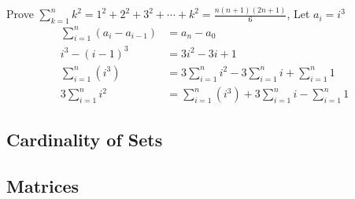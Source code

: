 \documentclass{article}
\begin{document}
Prove $ \sum_{k = 1}^{n} k^2 = 1^2 + 2^2 + 3^2 + \cdots + k^2 = \frac{ n \left( n + 1 \right) \left( 2n + 1 \right) }{ 6 } $, Let $ a_i = i^3 $
\begin{align*}
	\sum_{i = 1}^{n} \left( a_{i} - a_{i - 1} \right) & = a_{n} - a_0                                                                     \\
	i^3 - (i - 1)^{3}                                 & = 3i^2 - 3i + 1                                                                   \\
	\sum_{i = 1}^{n} \left( i^3 \right)               & = 3 \sum_{i = 1}^{n} i^2 - 3 \sum_{i = 1}^{n} i + \sum_{i = 1}^{n} 1              \\
	3 \sum_{i = 1}^{n} i^2                            & = \sum_{i = 1}^{n} \left( i^3 \right) + 3 \sum_{i = 1}^{n} i - \sum_{i = 1}^{n} 1
\end{align*}

\subsection{Cardinality of Sets}

\subsection{Matrices}
\end{document}
